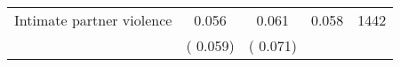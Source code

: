 \begin{tabular}{l*{4}{c}}
 Intimate partner violence &              0.056 &         0.061 &           0.058 & 1442                       \\  
                 &        (       0.059)                   &        (       0.071)                        &                                                             &                                                      \\      

\hline \end{tabular}                                                                                                              
